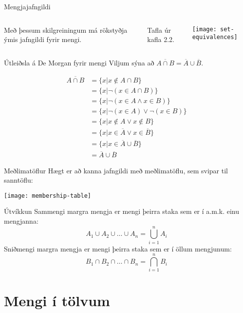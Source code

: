 \documentclass{beamer}
\begin{document}
\begin{frame}{Mengjajafngildi}
\begin{columns}
Með þessum skilgreiningum má rökstyðja ýmis jafngildi fyrir mengi.

\vspace*{0.5cm}
Tafla úr kafla 2.2.
\begin{center}
\texttt{[image: set-equivalences]}
\end{center}
\end{columns}
\end{frame}

\begin{frame}{Útleiðsla á De Morgan fyrir mengi}
Viljum sýna að $\overline{A \cap B} = \overline{A} \cup \overline{B}$.

\begin{align*}
\overline{A \cap B} &= \{x | x \notin A \cap B\}\\ 
&= \{x | \lnot ( x \in A \cap B)\}\\ 
&= \{x | \lnot ( x \in A \land x \in B)\}\\ 
&= \{x | \lnot ( x \in A) \lor \lnot (x \in B)\}\\ 
&= \{x | x \notin A \lor x \notin B\}\\ 
&= \{x | x \in \overline{A} \lor x \in \overline{B}\}\\ 
&= \{x | x \in \overline{A} \cup \overline{B}\}\\ 
&= \overline{A} \cup \overline{B}
\end{align*}
\end{frame}

\begin{frame}{Meðlimatöflur}
Hægt er að kanna jafngildi með meðlimatöflu, sem svipar til sanntöflu:
\begin{center}
\texttt{[image: membership-table]}
\end{center}
\end{frame}

\begin{frame}{Útvíkkun}
Sammengi margra mengja er mengi þeirra staka sem er í a.m.k. einu mengjanna:
\[
 A_1 \cup A_2 \cup \ldots \cup A_n = \bigcup_{i=1}^n A_i
\]
Sniðmengi margra mengja er mengi þeirra staka sem er í öllum mengjunum:
\[
 B_1 \cap B_2 \cap \ldots \cap B_n = \bigcap_{i=1}^n B_i
\]
\end{frame}

\section{Mengi í tölvum}
\end{document}
